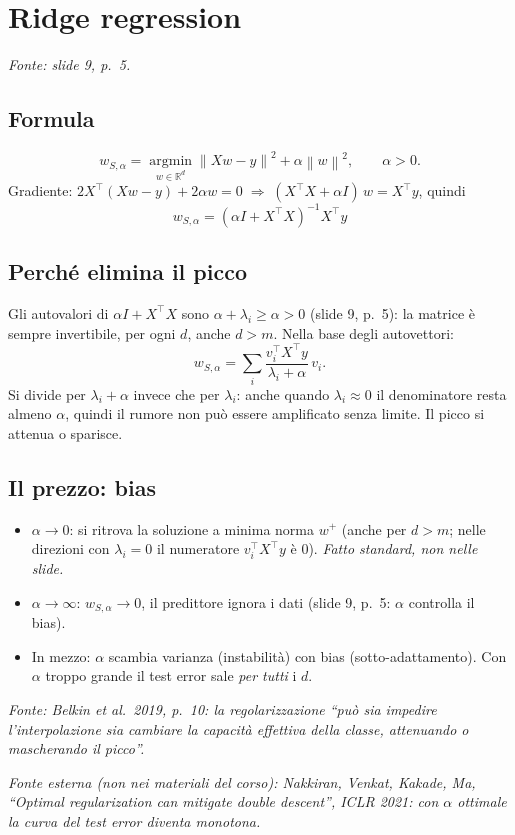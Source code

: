 \documentclass[11pt,a4paper]{article}
\newcommand{\R}{\mathbb{R}}
\newcommand{\norm}[1]{\left\lVert #1 \right\rVert}
\newcommand{\fonte}[1]{\par\noindent\textit{Fonte: #1}\par\smallskip}
\newcommand{\esterna}[1]{\par\noindent\textit{Fonte esterna (non nei materiali del corso): #1}\par\smallskip}
\begin{document}
\section{Ridge regression}
\fonte{slide 9, p.~5.}

\subsection{Formula}
\[
  w_{S,\alpha} = \operatorname*{argmin}_{w \in \R^d} \norm{Xw - y}^2 + \alpha \norm{w}^2 ,
  \qquad \alpha > 0 .
\]
Gradiente: $2X^\top(Xw - y) + 2\alpha w = 0 \;\Rightarrow\; (X^\top X + \alpha I)\,w = X^\top y$, quindi
\[
  \boxed{w_{S,\alpha} = (\alpha I + X^\top X)^{-1} X^\top y}
\]

\subsection{Perché elimina il picco}
Gli autovalori di $\alpha I + X^\top X$ sono $\alpha + \lambda_i \ge \alpha > 0$ (slide 9, p.~5): la matrice è sempre
invertibile, per ogni $d$, anche $d > m$. Nella base degli autovettori:
\[
  w_{S,\alpha} = \sum_{i} \frac{v_i^\top X^\top y}{\lambda_i + \alpha}\, v_i .
\]
Si divide per $\lambda_i + \alpha$ invece che per $\lambda_i$: anche quando $\lambda_i \approx 0$ il denominatore resta
almeno $\alpha$, quindi il rumore non può essere amplificato senza limite. Il picco si attenua o sparisce.

\subsection{Il prezzo: bias}
\begin{itemize}
  \item $\alpha \to 0$: si ritrova la soluzione a minima norma $w^{+}$ (anche per $d > m$; nelle direzioni con
        $\lambda_i = 0$ il numeratore $v_i^\top X^\top y$ è $0$). \emph{Fatto standard, non nelle slide.}
  \item $\alpha \to \infty$: $w_{S,\alpha} \to 0$, il predittore ignora i dati (slide 9, p.~5: $\alpha$ controlla il bias).
  \item In mezzo: $\alpha$ scambia varianza (instabilità) con bias (sotto-adattamento). Con $\alpha$ troppo grande il test
        error sale \emph{per tutti} i $d$.
\end{itemize}
\fonte{Belkin et al.\ 2019, p.~10: la regolarizzazione ``può sia impedire l'interpolazione sia cambiare la capacità effettiva della classe, attenuando o mascherando il picco''.}
\esterna{Nakkiran, Venkat, Kakade, Ma, ``Optimal regularization can mitigate double descent'', ICLR 2021: con $\alpha$
ottimale la curva del test error diventa monotona.}
\end{document}
